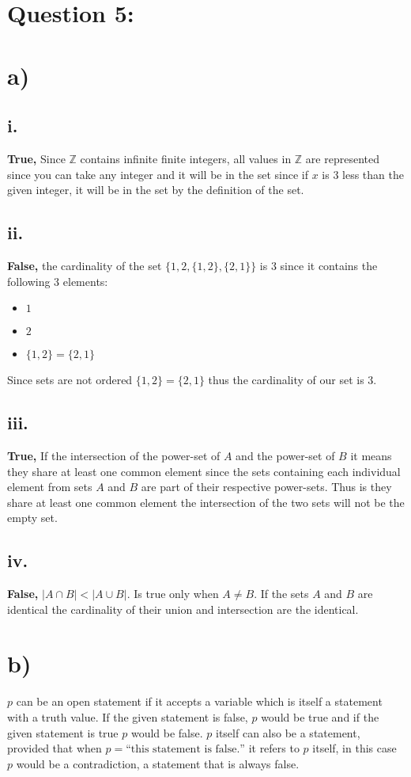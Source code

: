 \documentclass{article}
\begin{document}
\newpage
\section*{Question 5:}
\section*{a)}
\subsection*{i.}
\textbf{True, }Since $\mathbb{Z}$ contains infinite finite integers, all values in $\mathbb{Z}$ are represented since you can take any integer and it will be in the set since if $x$ is $3$ less than the given integer, it will be in the set by the definition of the set. 
\subsection*{ii.}
\textbf{False, }the cardinality of the set $\{1, 2, \{1, 2\}, \{2, 1\}\}$ is 3 since it contains the following 3 elements:
    \begin{itemize}
        \item $1$
        \item $2$
        \item $\{1,2\}=\{2,1\}$
    \end{itemize}
Since sets are not ordered $\{1,2\}=\{2,1\}$ thus the cardinality of our set is 3.
\subsection*{iii.}
\textbf{True, }If the intersection of the power-set of $A$ and the power-set of $B$ it means they share at least one common element since the sets containing each individual element from sets $A$ and $B$ are part of their respective power-sets. Thus is they share at least one common element the intersection of the two sets will not be the empty set.
\subsection*{iv.}
\textbf{False,} $\vert A \cap B \vert < \vert A \cup B \vert$. Is true only when $A \neq B$. If the sets $A$ and $B$ are identical the cardinality of their union and intersection are the identical.
    
\section*{b)}
$p$ can be an open statement if it accepts a variable which is itself a statement with a truth value. If the given statement is false, $p$ would be true and if the given statement is true $p$ would be false. $p$ itself can also be a statement, provided that when $p = \text{“this statement is false.”}$ it refers to $p$ itself, in this case $p$ would be a contradiction, a statement that is always false. 
\end{document}
